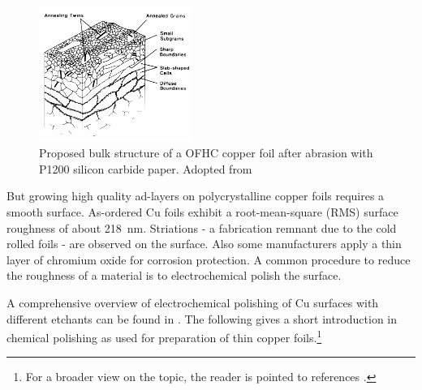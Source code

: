 

%	


\begin{figure}
	\includegraphics[width=5cm]{./images/grain-structure-copper-foil}
	\caption{Proposed bulk structure of a OFHC copper foil after abrasion with P1200 silicon carbide paper. Adopted from \cite{turley_nature_1981}}
	\label{fig:copper-foil-grains}
\end{figure}

But growing high quality ad-layers on polycrystalline copper foils requires a smooth surface. As-ordered Cu foils exhibit a root-mean-square (RMS) surface roughness of about \SI{218}{\nm}\cite{bin_zhang_low-temperature_2012}. Striations - a fabrication remnant due to the cold rolled foils - are observed on the surface\cite{kim_synthesis_2012-1}. Also some manufacturers apply a thin layer of chromium oxide for corrosion protection\cite{bin_zhang_low-temperature_2012}. A common procedure to reduce the roughness of a material is to electrochemical polish the surface.

A comprehensive overview of  electrochemical polishing of Cu surfaces with different etchants can be found in \cite{jinshan_electrochemical_2004}. The following gives a short introduction in chemical polishing as used for preparation of thin copper foils.\footnote{For a broader view on the topic, the reader is pointed to references \cite{antoine_polishing_1999, lilje_improved_2004, schulz_engeneering_2018}.}

